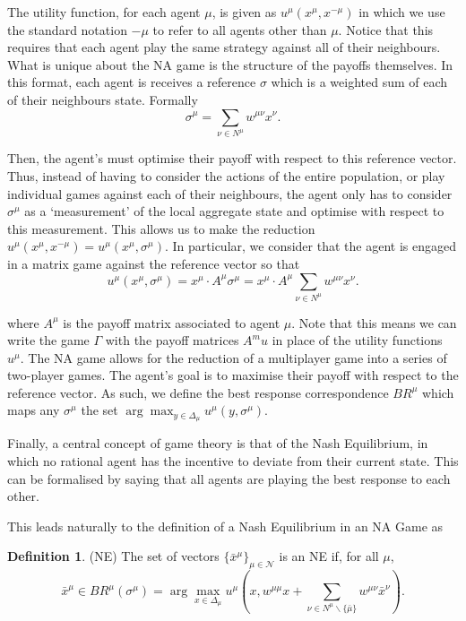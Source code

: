\documentclass{article}
\theoremstyle{definition}
\newtheorem*{definition}{Definition}
\newcommand{\agentset}{\mathcal{N}}
\newcommand{\utility}[1]{u^{#1}}
\newcommand{\wmunu}{w^{\mu \nu}}
\newcommand{\xmu}{x^{\mu}}
\newcommand{\xnu}{x^{\nu}}
\newcommand{\refmu}{\sigma^{\mu}}
\newcommand{\NE}[1]{\bar{x}^{#1}}
\newcommand{\weightedsum}{ \sum_{\nu \in N^\mu} \wmunu \xnu}
\newcommand{\xnotmu}{x^{-\mu}}
\begin{document}
  The utility function, for each agent $\mu$, is given as $u^\mu(\xmu, \xnotmu)$ in which we use
  the standard notation $-\mu$ to refer to all agents other than $\mu$. Notice that this requires
  that each agent play the same strategy against all of their neighbours. What is unique about the
  NA game is the structure of the payoffs themselves. In this format, each agent is receives a
  reference $\sigma$ which is a weighted sum of each of their neighbours
  state. Formally
  \begin{equation}
    \sigma^\mu = \sum_{\nu \in N^\mu} \wmunu \xnu.
  \end{equation}

  Then, the agent's must optimise their payoff with respect to this reference vector. Thus,
  instead of having to consider the actions of the entire population, or play individual games
  against each of their neighbours, the agent only has to consider $\sigma^\mu$ as a
  `measurement' of the local aggregate state and optimise with respect to this measurement.
  This allows us to make the reduction $u^\mu(\xmu, \xnotmu) = u^\mu(\xmu, \refmu)$. In
  particular, we consider that the agent is engaged in a matrix game against the
  reference vector so that
  \begin{equation}
    u^\mu(\xmu, \refmu) = \xmu \cdot A^\mu \refmu = \xmu
                \cdot A^\mu \weightedsum.
  \end{equation}

  where $A^\mu$ is the payoff matrix associated to agent $\mu$. Note that this means we can write
  the game $\Gamma$ with the payoff matrices $A^mu$ in place of the utility functions
  $\utility{\mu}$. The NA game allows for the reduction of a multiplayer game into a series of
  two-player games. The agent's goal is to maximise their payoff with respect to the reference
  vector. As such, we define the best response correspondence $BR^\mu$ which maps any $\refmu$
  the set $\arg \max_{y \in \Delta_\mu} {u^\mu(y, \refmu)}$. 

  Finally, a central concept of game theory is that of the Nash Equilibrium, in which no rational
  agent has the incentive to deviate from their current state. This can be formalised by saying
  that all agents are playing the best response to each other.

  This leads naturally to the definition of a Nash Equilibrium in an NA Game as

  \begin{definition}(NE)
    The set of vectors $\{ \NE{\mu}\}_{\mu \in \agentset}$ is an NE if, for all $\mu$,  
    \begin{equation*}
    \NE{\mu} \in BR^\mu (\refmu) = \arg \max_{x \in \Delta_\mu} u^\mu(x, w^{\mu \mu} x + \sum_{\nu \in N^\mu \backslash \{\bar{\mu}\}} \wmunu \NE{\nu}).
    \end{equation*} 
  \end{definition}
    
\end{document}
